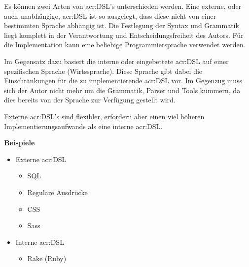 Es können zwei Arten von \gls{acr:DSL}'s unterschieden werden. Eine externe, oder auch unabhängige, \gls{acr:DSL} ist so ausgelegt, dass diese nicht von einer bestimmten Sprache abhängig ist. Die Festlegung der Syntax und Grammatik liegt komplett in der Verantwortung und Entscheidungsfreiheit des Autors. Für die Implementation kann eine beliebige Programmiersprache verwendet werden.

Im Gegensatz dazu basiert die interne oder eingebettete \gls{acr:DSL} auf einer spezifischen Sprache (Wirtssprache). Diese Sprache gibt dabei die Einschränkungen für die zu implementierende \gls{acr:DSL} vor. Im Gegenzug muss sich der Autor nicht mehr um die Grammatik, Parser und Tools kümmern, da dies bereits von der Sprache zur Verfügung gestellt wird.

Externe \gls{acr:DSL}'s sind flexibler, erfordern aber einen viel höheren Implementierungsaufwands als eine interne \gls{acr:DSL}.

\textbf{Beispiele}
\begin{itemize}
\item Externe \gls{acr:DSL}
\begin{itemize}
\item SQL
\item Reguläre Ausdrücke
\item CSS
\item Sass
\end{itemize}
\item Interne \gls{acr:DSL}
\begin{itemize}
\item Rake (Ruby)
\end{itemize}
\end{itemize}



